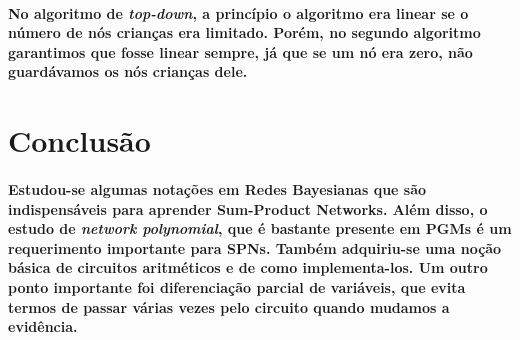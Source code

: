 \documentclass[a4paper,10pt]{article}
\theoremstyle{plain}
\begin{document}
\paragraph{
  No algoritmo de \textit{top-down}, a princípio o algoritmo era linear se o número de nós crianças
era limitado. Porém, no segundo algoritmo garantimos que fosse linear sempre, já que se um nó era
zero, não guardávamos os nós crianças dele.
}

\section{Conclusão}

\paragraph{
  Estudou-se algumas notações em Redes Bayesianas que são indispensáveis para aprender Sum-Product
Networks. Além disso, o estudo de \textit{network polynomial}, que é bastante presente em PGMs é
um requerimento importante para SPNs. Também adquiriu-se uma noção básica de circuitos
aritméticos e de como implementa-los. Um outro ponto importante foi diferenciação parcial de
variáveis, que evita termos de passar várias vezes pelo circuito quando mudamos a evidência.
}

\newpage

\printbibliography
\end{document}
